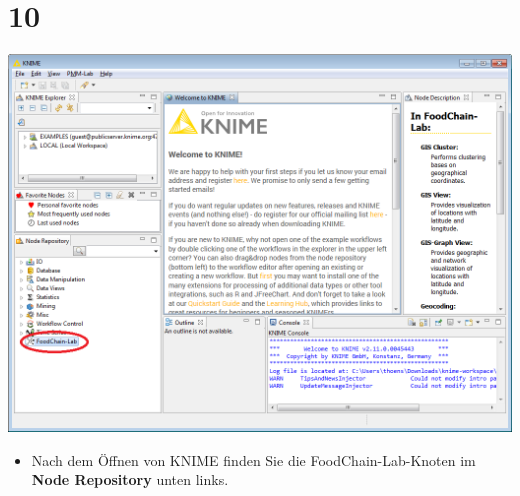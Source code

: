 \documentclass{beamer}
\begin{document}
\section{10}
\begin{frame}
	\begin{center}
  		\includegraphics[height=0.6\textheight]{10.png}
	\end{center}
	\begin{itemize}
		\item Nach dem Öffnen von KNIME finden Sie die FoodChain-Lab-Knoten im \textbf{Node Repository} unten links.
	\end{itemize}
\end{frame}
\end{document}
